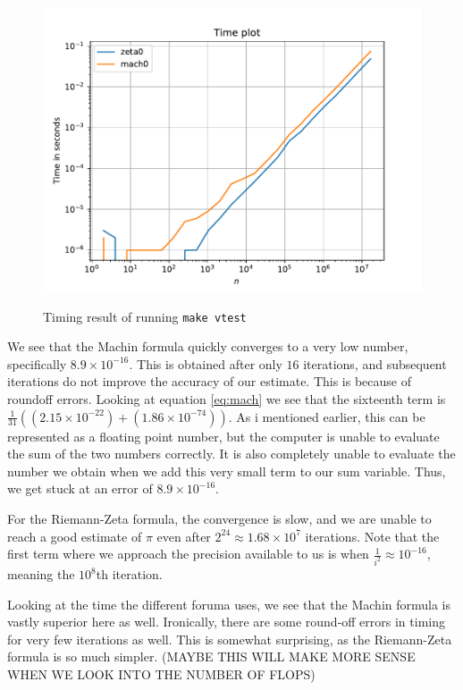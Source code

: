 \documentclass[12pt]{article}
\begin{document}
\begin{figure}[!htb]
    \centering
    \caption{Timing result of running \texttt{make vtest}}
    \includegraphics[width=\textwidth]{Time1}
    \label{fig:Time1}
\end{figure}
We see that the Machin formula quickly converges to a very low number, specifically $8.9 \times 10^{-16}$. 
This is obtained after only $16$ iterations, and subsequent iterations do not improve the accuracy of our estimate.
This is because of roundoff errors. Looking at equation \eqref{eq:mach} we see that the sixteenth term is $\frac{1}{31}((2.15 \times 10^{-22}) + (1.86 \times 10^{-74}))$. 
As i mentioned earlier, this can be represented as a floating point number, but the computer is unable to evaluate the sum of the two numbers correctly.
It is also completely unable to evaluate the number we obtain when we add this very small term to our sum variable. Thus, we get stuck at an error of $8.9 \times 10^{-16}$.

For the Riemann-Zeta formula, the convergence is slow, and we are unable to reach a good estimate of $\pi$ even after $2^{24} \approx 1.68 \times 10^7$ iterations. Note that
the first term where we approach the precision available to us is when $\frac{1}{i^2} \approx 10^{-16}$, meaning the $10^8$th iteration. 

Looking at the time the different foruma uses, we see that the Machin formula is vastly superior here as well. Ironically, there are some round-off errors in timing for very few iterations as well.
This is somewhat surprising, as the Riemann-Zeta formula is so much simpler. (MAYBE THIS WILL MAKE MORE SENSE WHEN WE LOOK INTO THE NUMBER OF FLOPS)
\end{document}
